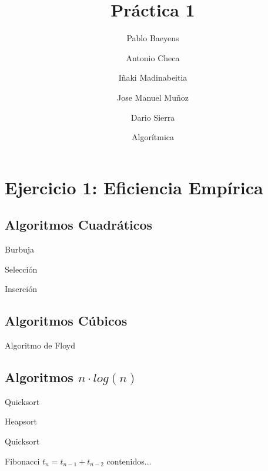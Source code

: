 \documentclass[10pt,compress,usetitleprogressbar,mathserif]{beamer}
\title{Práctica 1}
\author{Pablo Baeyens \and Antonio Checa \and Iñaki Madinabeitia \and Jose Manuel Muñoz \and Dario Sierra}
\date{Algorítmica}
\begin{document}
\maketitle
\section{Ejercicio 1: \large{Eficiencia Empírica }}

\subsection{Algoritmos Cuadráticos}

\begin{frame}{Burbuja}
	
\end{frame}

\begin{frame}{Selección}
	
\end{frame}

\begin{frame}{Inserción}
	
\end{frame}

\subsection{Algoritmos Cúbicos}

\begin{frame}{Algoritmo de Floyd}

\end{frame}

\subsection{Algoritmos $n\cdot log(n)$ }

\begin{frame}{Quicksort}

\end{frame}

\begin{frame}{Heapsort}
	
\end{frame}

\begin{frame}{Quicksort}
	
\end{frame}

\begin{frame}{Fibonacci $t_n=t_{n-1}+t_{n-2}$}
	contenidos...
\end{frame}
\end{document}
